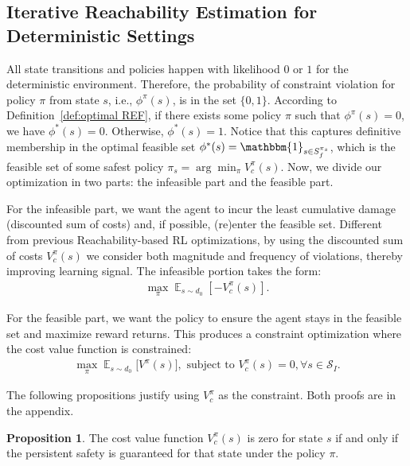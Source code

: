 \documentclass{article}
\theoremstyle{definition}
\DeclareMathOperator*{\E}{\mathbb{E}}
\newtheorem{prop}{Proposition}
\begin{document}
\subsection{Iterative Reachability Estimation for Deterministic Settings}
\label{section:DeteriministicOPF}
All state transitions and policies happen with likelihood $0$ or $1$ for the deterministic environment. Therefore, the probability of constraint violation for policy $\pi$ from state $s$, i.e., $\phi^\pi(s)$, is in the set $\{0, 1\}$. According to Definition~\ref{def:optimal REF}, if there exists some policy $\pi$ such that $\phi^\pi(s)=0$, we have $\phi^*(s)=0$. Otherwise, $\phi^*(s)=1$. Notice that this captures definitive membership in the optimal feasible set $\phi^*(s)=\mathbbm{1}_{s\in S^{\pi_s}_f}$, which is the feasible set of some safest policy $\pi_s=\arg\min_\pi V^\pi_c (s)$. Now, we divide our optimization in two parts: the infeasible part and the feasible part. 


For the infeasible part, we want the agent to incur the least cumulative damage (discounted sum of costs) and, if possible, (re)enter the feasible set. Different from previous Reachability-based RL optimizations, by using the discounted sum of costs $V^\pi_c(s)$ we consider both magnitude and frequency of violations, thereby improving learning signal. The infeasible portion takes the form:
\vspace{1pt}
\begin{align}\label{eqn:infeasibleOF}
    \max_\pi \E_{s\sim d_0}[-V^\pi_c(s)].
\end{align}

\vspace{-8pt}
For the feasible part, we want the policy to ensure the agent stays in the feasible set and maximize reward returns. This produces a constraint optimization where the cost value function is constrained:
\vspace{-2pt}
\begin{equation}
\label{eqn:feasibleOF}
\begin{split}
    \max_\pi \E_{s\sim d_0}\bigl[V^\pi(s)\bigr],\text{ subject to } V^{\pi}_c (s) = 0, \forall s\in \mathcal{S}_I.
\end{split}
\end{equation}

\vspace{-5pt}
The following propositions justify using $V^\pi_c$ as the constraint. Both proofs are in the appendix.
\begin{prop}
The cost value function $V_c^\pi (s)$ is zero for state $s$ if and only if the persistent safety is guaranteed for that state under the policy $\pi$. 
\end{prop}
\vspace{-5pt}
\end{document}
